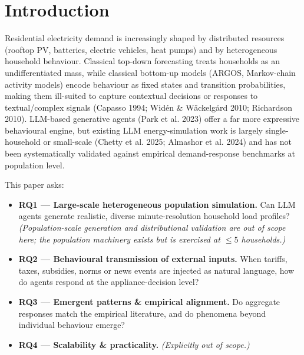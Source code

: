 \documentclass[11pt]{article}
\begin{document}
\section{Introduction}
Residential electricity demand is increasingly shaped by distributed resources (rooftop PV, batteries,
electric vehicles, heat pumps) and by heterogeneous household behaviour. Classical top-down forecasting
treats households as an undifferentiated mass, while classical bottom-up models (ARGOS, Markov-chain
activity models) encode behaviour as fixed states and transition probabilities, making them ill-suited to
capture contextual decisions or responses to textual/complex signals (Capasso 1994; Wid\'en \& W\"ackelg\r{a}rd
2010; Richardson 2010). LLM-based generative agents (Park et al. 2023) offer a far more expressive
behavioural engine, but existing LLM energy-simulation work is largely single-household or small-scale
(Chetty et al. 2025; Almashor et al. 2024) and has not been systematically validated against empirical
demand-response benchmarks at population level.

This paper asks:
\begin{itemize}
\item \textbf{RQ1 --- Large-scale heterogeneous population simulation.} Can LLM agents generate realistic,
diverse minute-resolution household load profiles? \emph{(Population-scale generation and distributional
validation are out of scope here; the population machinery exists but is exercised at $\le 5$ households.)}
\item \textbf{RQ2 --- Behavioural transmission of external inputs.} When tariffs, taxes, subsidies, norms or
news events are injected as natural language, how do agents respond at the appliance-decision level?
\item \textbf{RQ3 --- Emergent patterns \& empirical alignment.} Do aggregate responses match the empirical
literature, and do phenomena beyond individual behaviour emerge?
\item \textbf{RQ4 --- Scalability \& practicality.} \emph{(Explicitly out of scope.)}
\end{itemize}
\end{document}
